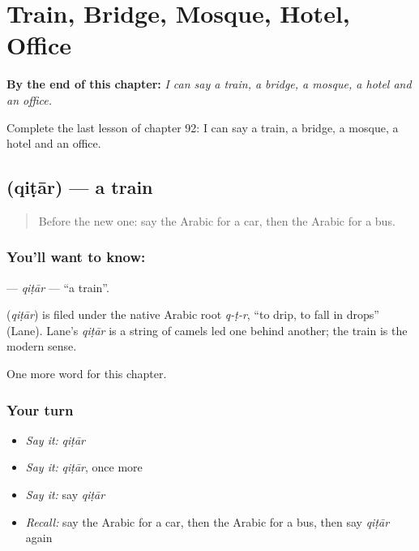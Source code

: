 
\chapter{Train, Bridge, Mosque, Hotel, Office}
\label{ch:ar-train-bridge-mosque-hotel-office}

\begin{chapteropening}
\textbf{By the end of this chapter:} \emph{I can say a train, a bridge, a mosque, a hotel and an office.}

Complete the last lesson of chapter 92: I can say a train, a bridge, a mosque, a hotel and an office.
\end{chapteropening}

\section[\texorpdfstring{\ar{قطار} (qiṭār)}{قطار (qiṭār)}]{ (qiṭār) — a train}

\label{lesson:AR-C92-qitar}



\begin{quote}
Before the new one: say the Arabic for a car, then the Arabic for a bus.
\end{quote}

\subsection*{You'll want to know: }
\textbf{} — \emph{qiṭār} — \textquotedblleft{}a train\textquotedblright{}.

\begin{cousinweb}
\textbf{} (\emph{qiṭār}) is filed under the native Arabic root \emph{q-ṭ-r}, \textquotedblleft{}to drip, to fall in drops\textquotedblright{} (Lane). Lane's \emph{qiṭār} is a string of camels led one behind another; the train is the modern sense.
\end{cousinweb}

\begin{grammarlens}[title={What you've built}]
One more word for this chapter.
\end{grammarlens}

\subsection*{Your turn}
\begin{itemize}
\raggedright
  \item \emph{Say it:} \emph{qiṭār}
  \item \emph{Say it:} \emph{qiṭār}, once more
  \item \emph{Say it:} say \emph{qiṭār}
  \item \emph{Recall:} say the Arabic for a car, then the Arabic for a bus, then say \emph{qiṭār} again
\end{itemize}

